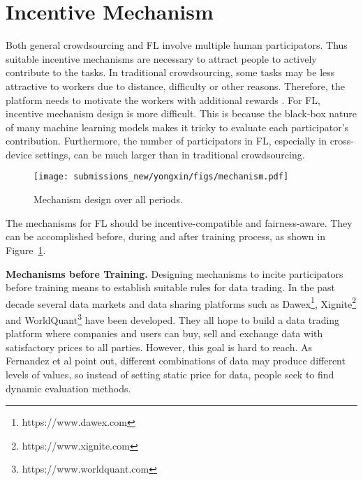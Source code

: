\documentclass[11pt]{article}
\newcommand\figref[1]{Figure~\ref{#1}}
\newcommand{\fakeparagraph}[1]{\vspace{1mm}\noindent\textbf{#1.}}
\begin{document}
\section{Incentive Mechanism}
\label{sec:IncentiveMechanismDesign}
Both general crowdsourcing and FL involve multiple human participators. 
Thus suitable incentive mechanisms are necessary to attract people to actively contribute to the tasks.
In traditional crowdsourcing, some tasks may be less attractive to workers due to distance, difficulty or other reasons.
Therefore, the platform needs to motivate the workers with additional rewards \cite{DBLP:conf/sigmod/TongWZCDY18}. 
For FL, incentive mechanism design is more difficult. 
This is because the black-box nature of many machine learning models makes it tricky to evaluate each participator's contribution. 
Furthermore, the number of participators in FL, especially in cross-device settings, can be much larger than in traditional crowdsourcing.

\begin{figure}
\centering
\texttt{[image: submissions\_new/yongxin/figs/mechanism.pdf]}
\caption{Mechanism design over all periods.}
\label{fig:mechanism}
\end{figure}

The mechanisms for FL should be incentive-compatible and fairness-aware.
They can be accomplished before, during and after training process, as shown in \figref{fig:mechanism}.

\fakeparagraph{Mechanisms before Training}
Designing mechanisms to incite participators before training means to establish suitable rules for data trading.
In the past decade several data markets and data sharing platforms such as Dawex\footnote{https://www.dawex.com}, Xignite\footnote{https://www.xignite.com} and WorldQuant\footnote{https://www.worldquant.com} have been developed.
They all hope to build a data trading platform where companies and users can buy, sell and exchange data with satisfactory prices to all parties.
However, this goal is hard to reach. As Fernandez et al point out, different combinations of data may produce different levels of values\cite{DBLP:journals/pvldb/FernandezSF20}, 
so instead of setting static price for data, people seek to find dynamic evaluation methods.
\end{document}
